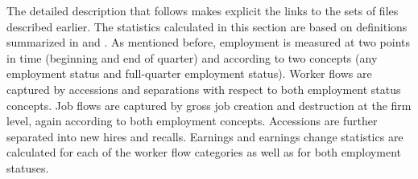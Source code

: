 
%
%


The detailed description that follows makes explicit the links to the sets
of files described earlier.
The statistics calculated in this section are based on definitions  summarized in \Cite{AbowdCorbelKramarz99} and
\Cite{DavisHaltiwanger99}. 
As mentioned before, employment is measured at two points in
time (beginning and end of  
quarter) and according to two concepts (any employment status and 
full-quarter employment status). Worker flows are captured by accessions and 
separations with respect to both employment status concepts. Job flows are 
captured by gross job creation and destruction at the firm level, again 
according to both employment concepts. Accessions are further separated into 
new hires and recalls. Earnings and earnings change statistics are 
calculated for each of the worker flow categories as well as for both 
employment statuses.


